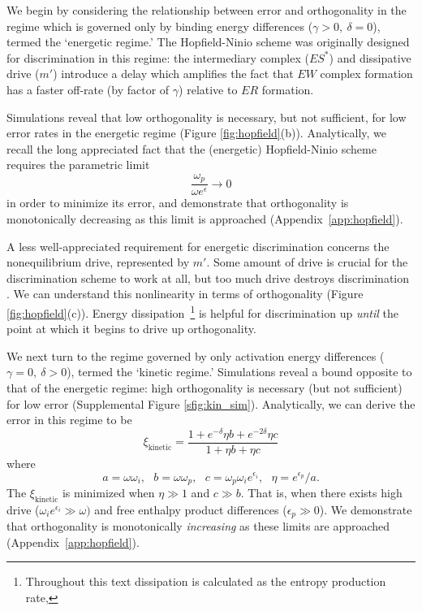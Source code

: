We begin by considering the relationship between error and orthogonality in the regime which is governed only by binding energy differences ($\gamma >0, \ \delta=0$), termed the `energetic regime.'  The Hopfield-Ninio scheme was originally designed for discrimination in this regime: the intermediary complex ($ES^*$) and dissipative drive ($m'$) introduce a delay which amplifies the fact that $EW$ complex formation has a faster off-rate (by factor of $\gamma$) relative to $ER$ formation.  

Simulations reveal that low orthogonality is necessary, but not sufficient, for low error rates in the energetic regime (Figure  \ref{fig:hopfield}(b)).  Analytically, we recall the long appreciated fact that the (energetic) Hopfield-Ninio scheme requires the parametric limit
\[
\frac{\omega_p}{\omega e^{\epsilon}}\rightarrow0 
\]
in order to minimize its error, and demonstrate that orthogonality is monotonically decreasing as this limit is approached (Appendix~\ref{app:hopfield}).

A less well-appreciated requirement for energetic discrimination concerns the nonequilibrium drive, represented by $m'.$  Some amount of drive is crucial for the discrimination scheme to work at all, but too much drive destroys discrimination \cite{Wong2018}.  We can understand this nonlinearity in terms of orthogonality (Figure  \ref{fig:hopfield}(c)).  Energy dissipation~\footnote{Throughout this text dissipation is calculated as the entropy production rate, } is helpful for discrimination up {\it until} the point at which it begins to drive up orthogonality.

We next turn to the regime governed by only activation energy differences ($\gamma =0, \ \delta > 0$), termed the `kinetic regime.'  Simulations reveal a bound opposite to that of the energetic regime: high orthogonality is necessary (but not sufficient) for low error (Supplemental Figure \ref{sfig:kin_sim}).  Analytically, we can derive the error in this regime to be
\[
\xi_{\text{kinetic}} = \frac{1+e^{-\delta}\eta b+e^{-2\delta} \eta c}{1+\eta b+\eta c}
\]
where 
\[
a = \omega\omega_i, \ \ \ b = \omega\omega_p, \ \ \ c = \omega_p\omega_i e^{\epsilon_i}, \ \ \ \eta=e^{\epsilon_p}/a.
\]
The $\xi_{\text{kinetic}}$ is minimized when $\eta\gg1$ and $c\gg b.$  That is, when there exists high drive ($\omega_i e^{\epsilon_i}\gg\omega)$ and free enthalpy product differences ($\epsilon_p\gg0$).  We demonstrate that orthogonality is monotonically {\it increasing} as these limits are approached (Appendix~\ref{app:hopfield}).

